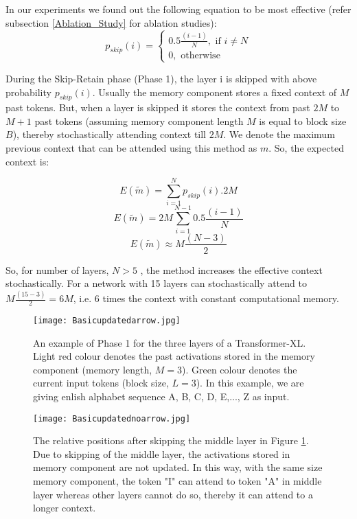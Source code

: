 \documentclass[11pt]{article}
\begin{document}
In our experiments we found out the following equation to be most effective (refer subsection \ref{Ablation_Study} for ablation studies):
\[
    p_{skip}(i)= 
    \begin{cases}
        0.5 \frac{(i-1)}{N} , \text{ if  } i \neq N \\
        0 , \text{  otherwise}
    \end{cases}
\]

During the Skip-Retain phase (Phase 1), the layer i is skipped with above probability $p_{skip}(i)$. Usually the memory component stores a fixed context of  $M$ past tokens. But, when a layer is skipped it stores the context from past $2M$ to $M+1$ past tokens (assuming memory component length $M$ is equal to block size $B$), thereby  stochastically attending context  till $2M$. We denote the maximum previous context that can be attended using this method as $m$. So, the expected context is:

\[
     E(\widetilde{m})  =  \sum_{i=1}^{N} p_{skip}(i).2M
\]
\[
    E(\widetilde{m})  =  2M \sum_{i=1}^{N-1} 0.5 \frac{(i-1)}{N}
\]
\begin{equation}
\label{eqn:expected_context}
     E(\widetilde{m})  \approx  M \frac{(N-3)}{2}
\end{equation}

So, for number of layers, $N>5$ , the method increases the effective context stochastically. For a network with  15 layers can stochastically attend to $M \frac{(15-3)}{2} = 6M$, i.e. 6 times the context with constant computational memory.







\begin{figure}
\hspace{\fill}
\centering
\texttt{[image: Basicupdatedarrow.jpg]}
      \caption{An example of Phase 1 for the three layers of a Transformer-XL. Light red colour denotes the past activations stored in the memory component (memory length, $M=3$). Green colour denotes the current input tokens (block size, $L=3$). In this example, we are giving enlish alphabet sequence A, B, C, D, E,..., Z as input. }
    
    
    \label{fig:fig1}
\end{figure}



\begin{figure}
\hspace{\fill}
\centering
\texttt{[image: Basicupdatednoarrow.jpg]}
\caption{The relative positions after skipping the middle layer in Figure \ref{fig:fig1}. Due to skipping of the middle layer, the activations stored in memory component are not updated. In this way, with the same size memory component, the token "I" can attend to token "A" in middle layer whereas other layers cannot do so, thereby it can attend to a longer context.}
    \label{fig:fig2}
\end{figure}
\end{document}
